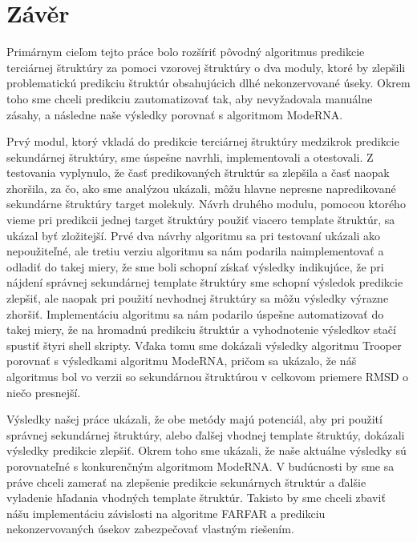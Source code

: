 \chapter*{Závěr}
Primárnym cieľom tejto práce bolo rozšíriť pôvodný algoritmus predikcie terciárnej štruktúry za pomoci vzorovej štruktúry o dva moduly, ktoré by zlepšili problematickú predikciu štruktúr obsahujúcich dlhé nekonzervované úseky. Okrem toho sme chceli predikciu zautomatizovať tak, aby nevyžadovala manuálne zásahy, a následne naše výsledky porovnať s algoritmom ModeRNA.

\indent Prvý modul, ktorý vkladá do predikcie terciárnej štruktúry medzikrok predikcie sekundárnej štruktúry, sme úspešne navrhli, implementovali a otestovali. Z testovania vyplynulo, že časť predikovaných štruktúr sa zlepšila a časť naopak zhoršila, za čo, ako sme analýzou ukázali, môžu hlavne nepresne napredikované sekundárne štruktúry target molekuly.
Návrh druhého modulu, pomocou ktorého vieme pri predikcii jednej target štruktúry použiť viacero template štruktúr, sa ukázal byť zložitejší. Prvé dva návrhy algoritmu sa pri testovaní ukázali ako nepoužiteľné, ale tretiu verziu algoritmu sa nám podarila naimplementovať a odladiť do takej miery, že sme boli schopní získať výsledky indikujúce, že pri nájdení správnej sekundárnej template štruktúry sme schopní výsledok predikcie zlepšiť, ale naopak pri použití nevhodnej štruktúry sa môžu výsledky výrazne zhoršiť.
Implementáciu algoritmu sa nám podarilo úspešne automatizovať do takej miery, že na hromadnú predikciu štruktúr a vyhodnotenie výsledkov stačí spustiť štyri shell skripty. Vďaka tomu sme dokázali výsledky algoritmu Trooper porovnať s výsledkami algoritmu ModeRNA, pričom sa ukázalo, že náš algoritmus bol vo verzii so sekundárnou štruktúrou v celkovom priemere RMSD o niečo presnejší.  

  
\indent Výsledky našej práce ukázali, že obe metódy majú potenciál, aby pri použití správnej sekundárnej štruktúry, alebo ďalšej vhodnej template štruktúy, dokázali výsledky predikcie zlepšiť. Okrem toho sme ukázali, že naše aktuálne výsledky sú porovnateľné s konkurenčným algoritmom ModeRNA.
V budúcnosti by sme sa práve chceli zamerať na zlepšenie predikcie sekunárnych štruktúr a ďalšie vyladenie hľadania vhodných template štruktúr. Takisto by sme chceli zbaviť nášu implementáciu závislosti na algoritme FARFAR a predikciu nekonzervovaných úsekov zabezpečovať vlastným riešením.
